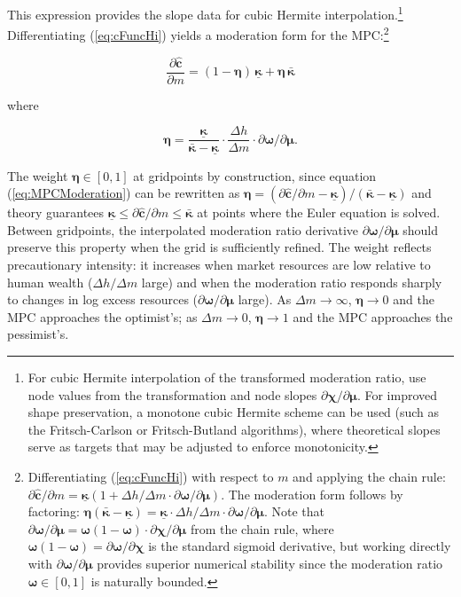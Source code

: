 \documentclass[preprint,authoryear]{elsarticle}
\newcommand{\mNrm}{m}
\newcommand{\cFunc}{\mathbf{c}}
\newcommand{\hNrm}{h}
\newcommand{\MPC}{\boldsymbol{\kappa}}
\newcommand{\MPCmin}{\underline{\MPC}}
\newcommand{\logmNrmEx}{\boldsymbol{\mu}}
\newcommand{\modRte}{\boldsymbol{\omega}}
\newcommand{\mNrmEx}{\Delta \mNrm}
\newcommand{\hNrmEx}{\Delta \hNrm}
\newcommand{\cFuncReal}{\hat{\cFunc}}
\newcommand{\logitModRte}{\boldsymbol{\chi}}
\newcommand{\MPCmax}{\bar{\MPC}}
\newcommand{\logitModRteMu}{\partial \logitModRte / \partial \logmNrmEx}
\newcommand{\modRteMu}{\partial \modRte / \partial \logmNrmEx}
\newcommand{\MPCmod}{\boldsymbol{\eta}}
\begin{document}
This expression provides the slope data for cubic Hermite interpolation.\footnote{For cubic Hermite interpolation of the transformed moderation ratio, use node values from the transformation and node slopes $\logitModRteMu$. For improved shape preservation, a monotone cubic Hermite scheme \citep{deBoor2001} can be used (such as the Fritsch-Carlson or Fritsch-Butland algorithms), where theoretical slopes serve as targets that may be adjusted to enforce monotonicity.} Differentiating (\ref{eq:cFuncHi}) yields a moderation form for the MPC:\footnote{Differentiating (\ref{eq:cFuncHi}) with respect to $\mNrm$ and applying the chain rule: $\partial \cFuncReal/\partial \mNrm = \MPCmin \left(1 + \hNrmEx/\mNrmEx \cdot \modRteMu\right)$. The moderation form follows by factoring: $\MPCmod(\MPCmax -\MPCmin) = \MPCmin \cdot \hNrmEx/\mNrmEx \cdot \modRteMu$. Note that $\modRteMu = \modRte(1 -\modRte) \cdot \logitModRteMu$ from the chain rule, where $\modRte(1 -\modRte) = \partial\modRte/\partial\logitModRte$ is the standard sigmoid derivative, but working directly with $\modRteMu$ provides superior numerical stability since the moderation ratio $\modRte \in [0,1]$ is naturally bounded.}

\begin{equation}
\label{eq:MPCModeration}
\frac{\partial \cFuncReal}{\partial \mNrm} = (1-\MPCmod)\,\MPCmin + \MPCmod\,\MPCmax
\end{equation}

where

\begin{equation}
\label{eq:MPCModerationWeight}
\MPCmod = \frac{\MPCmin}{\MPCmax-\MPCmin} \cdot \frac{\hNrmEx}{\mNrmEx} \cdot \partial \modRte / \partial \logmNrmEx.
\end{equation}

The weight $\MPCmod \in [0,1]$ at gridpoints by construction, since equation (\ref{eq:MPCModeration}) can be rewritten as $\MPCmod = (\partial \cFuncReal/\partial \mNrm - \MPCmin)/(\MPCmax - \MPCmin)$ and theory guarantees $\MPCmin \leq \partial \cFuncReal/\partial \mNrm \leq \MPCmax$ at points where the Euler equation is solved. Between gridpoints, the interpolated moderation ratio derivative $\modRteMu$ should preserve this property when the grid is sufficiently refined. The weight reflects precautionary intensity: it increases when market resources are low relative to human wealth ($\hNrmEx/\mNrmEx$ large) and when the moderation ratio responds sharply to changes in log excess resources ($\modRteMu$ large). As $\mNrmEx \to \infty$, $\MPCmod \to 0$ and the MPC approaches the optimist's; as $\mNrmEx \to 0$, $\MPCmod \to 1$ and the MPC approaches the pessimist's.
\end{document}
